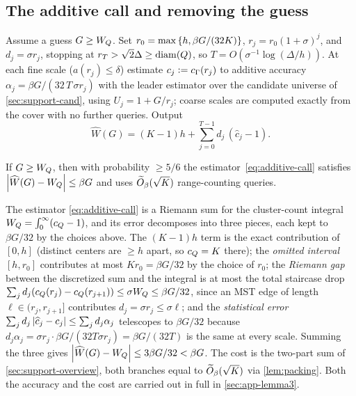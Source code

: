 \subsection{The additive call and removing the guess}\label{sec:support-call}

Assume a guess $G\ge W_Q$. Set $r_0=\max\left\{h,\beta G/(32K)\right\}$, $r_j=r_0(1+\sigma)^j$, and $d_j=\sigma
r_j$, stopping at $r_T>\sqrt2\Delta\ge\operatorname{diam}(Q)$, so $T=O(\sigma^{-1}\log(\Delta/h))$. At each fine scale ($a(r_j)\le
\delta$) estimate $c_j\vcentcolon=c_\Gamma(r_j)$ to additive accuracy $\alpha_j=\beta G/(32\,T\,\sigma r_j)$ with the
leader estimator over the candidate universe of \cref{sec:support-cand}, using $U_j=1+G/r_j$; coarse
scales are computed exactly from the cover with no further queries. Output
\begin{equation}\label{eq:additive-call}
  \widehat W(G)=(K-1)h+\sum_{j=0}^{T-1} d_j\,(\widehat c_j-1).
\end{equation}

\begin{lemma}\label{lem:additive}
If $G\ge W_Q$, then with probability $\ge 5/6$ the estimator~\eqref{eq:additive-call} satisfies
$\left|\widehat W(G)-W_Q\right|\le\beta G$ and uses $\widetilde{O}_\beta(\sqrt K)$ range-counting queries.
\end{lemma}

The estimator \eqref{eq:additive-call} is a Riemann sum for the cluster-count integral $W_Q=\int_0^\infty
(c_Q-1)$, and its error decomposes into three pieces, each kept to $\beta G/32$ by the choices above. The
$(K-1)h$ term is the exact contribution of $[0,h]$ (distinct centers are $\ge h$ apart, so $c_Q=K$ there);
the \emph{omitted interval} $[h,r_0]$ contributes at most $Kr_0=\beta G/32$ by the choice of $r_0$; the
\emph{Riemann gap} between the discretized sum and the integral is at most the total staircase drop
$\sum_j d_j(c_Q(r_j)-c_Q(r_{j+1}))\le\sigma W_Q\le\beta G/32$, since an MST edge of length $\ell\in(r_j,
r_{j+1}]$ contributes $d_j=\sigma r_j\le\sigma\ell$; and the \emph{statistical error} $\sum_j d_j\left|\widehat
c_j-c_j\right|\le\sum_j d_j\alpha_j$ telescopes to $\beta G/32$ because $d_j\alpha_j=\sigma r_j\cdot\beta G/(32T
\sigma r_j)=\beta G/(32T)$ is the same at every scale. Summing the three gives $\left|\widehat W(G)-W_Q\right|\le
3\beta G/32<\beta G$. The cost is the two-part sum of \cref{sec:support-overview}, both branches equal to
$\widetilde{O}_\beta(\sqrt K)$ via \cref{lem:packing}. Both the accuracy and the cost are carried out in full in
\cref{sec:app-lemma3}.

